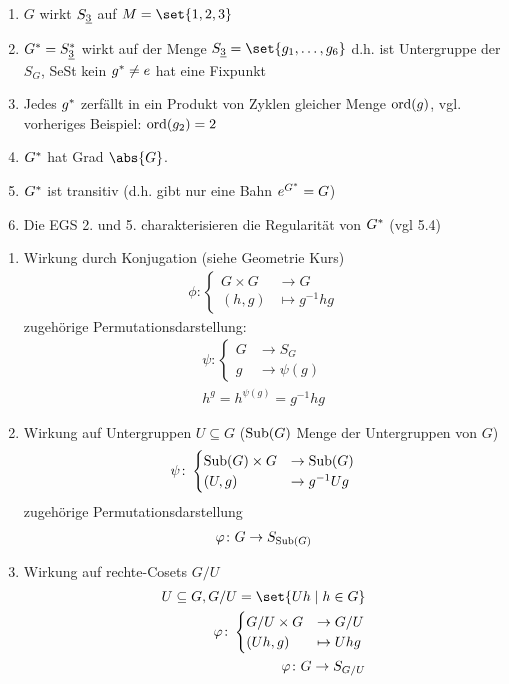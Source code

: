 \begin{*remark}
	\begin{enumerate}
		\item $G$ wirkt $S_{\underline{3}}$ auf $M = \set{1,2,3}$
		\item $\st{G} = \st{S}_{\uline{3}}$ wirkt auf der Menge $S_{\uline{3}} = \set{g_1, \dots, g_6}$ d.h. ist Untergruppe der $S_G$, SeSt kein $g^{\ast} \neq e$ hat eine Fixpunkt
		\item Jedes $g^{\ast}$ zerfällt in ein Produkt von Zyklen gleicher Menge $\operatorname{ord}(g)$, vgl. vorheriges Beispiel: $\operatorname{ord}(g_2) = 2$
		\item $G^{\ast}$ hat Grad $\abs{G}$.
		\item $G^{\ast}$ ist transitiv (d.h. gibt nur eine Bahn $e^{G^{\ast}} = G$)
		\item Die EGS 2. und 5. charakterisieren die Regularität von $G^{\ast}$ (vgl 5.4) 
	\end{enumerate}
\end{*remark}
\begin{example}
	\begin{enumerate}
		\item Wirkung durch Konjugation (siehe Geometrie Kurs)
		\begin{align*}
			\phi \colon \begin{cases}
				G \times G &\to G\\
				(h,g) &\mapsto g^{-1}hg
			\end{cases}
		\end{align*}
		zugehörige Permutationsdarstellung:
		\begin{align*}
			\psi \colon \begin{cases}
				G &\to S_G\\
				g &\to \psi(g)
			\end{cases}\\
		h^g = h^{\psi(g)} = g^{-1}hg
		\end{align*}
	\item Wirkung auf Untergruppen $U \subseteq G$ ($\operatorname{Sub}(G)$ Menge der Untergruppen von $G$)
		\begin{align*}
			\psi \colon \begin{cases}
				\operatorname{Sub}(G) \times G &\to \operatorname{Sub}(G)\\
				(U,g) &\to g^{-1}Ug
			\end{cases}
		\end{align*}
	zugehörige Permutationsdarstellung
	\begin{align*}
		\varphi \colon G \to S_{\operatorname{Sub}(G)}
	\end{align*}
	\item Wirkung auf rechte-Cosets $G/U$
	\begin{align*}
		U \subseteq G, G/U = \set{Uh \mid h \in G}\\
		\phi \colon \begin{cases}
			G/U \times G &\to G/U\\
			(Uh,g) &\mapsto Uhg
		\end{cases}\\
	\phi \colon G \to S_{G/U}
	\end{align*}
	\end{enumerate}
\end{example}
